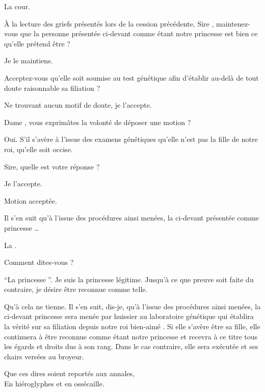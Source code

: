 \begin{drama}

  \huissierspeaks La cour.

  \nobleOnespeaks À la lecture des griefs présentés lors de la cession précédente, Sire \roi, maintenez-vous que la personne présentée ci-devant comme étant notre princesse \princesse{} est bien ce qu’elle prétend être ?

  \roispeaks Je le maintiens.

  \nobleTwospeaks Acceptez-vous qu’elle soit soumise au test génétique afin d’établir au-delà de tout doute raisonnable sa filiation ?

  \roispeaks Ne trouvant aucun motif de doute, je l’accepte.

  \nobleTreespeaks Dame \reine{}, vous exprimâtes la volonté de déposer une motion ?

  \reinespeaks Oui. S’il s’avère à l’issue des examens génétiques qu’elle n’est pas la fille de notre roi, qu’elle soit occise.

  \nobleOnespeaks Sire, quelle est votre réponse ?

  \roispeaks Je l’accepte.

   Motion acceptée.

  \nobleOnespeaks Il s’en suit qu’à l’issue des procédures ainsi menées, la ci-devant présentée comme  princesse \princesse{}…

  \elaspeaks La .

  \nobleOnespeaks Comment dites-vous ?

  \elaspeaks \enquote{La  princesse \princesse{}}. Je suis la princesse légitime. Jusqu’à ce que preuve soit faite du contraire, je désire être reconnue comme telle.

  \nobleOnespeaks Qu’à cela ne tienne. Il s’en suit, dis-je, qu’à l’issue des procédures ainsi menées, la ci-devant    princesse \princesse{} sera menée par huissier au laboratoire génétique qui établira la vérité sur sa filiation depuis notre roi bien-aimé \roi. Si elle s’avère être sa fille, elle continuera à être reconnue comme étant notre princesse \princesse{} et recevra à ce titre tous les égards et droits dus à son rang. Dans le cas contraire, elle sera exécutée et ses chairs versées au broyeur.

  \begin{minipage}[t]{\linewidth}
    Que ces dires soient reportés aux annales,\\
    En hiéroglyphes et en ossécaille.
  \end{minipage}
\end{drama}

